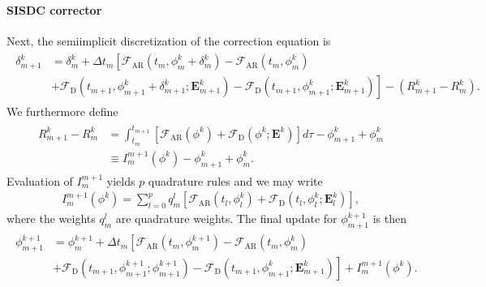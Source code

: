 \documentclass[letterpaper,10pt,english]{sphinxmanual}
\begin{document}
\paragraph{SISDC corrector}
\label{\detokenize{MinimalPlasmaModel:sisdc-corrector}}
Next, the semi\sphinxhyphen{}implicit discretization of the correction equation is
\begin{equation*}
\begin{split}\begin{split}
\delta_{m+1}^k &= \delta_m^k  + \Delta t_m\left[\mathcal{F}_{\textrm{AR}}\left(t_m, \phi_m^k + \delta_m^k\right) - \mathcal{F}_{\textrm{AR}}\left(t_m, \phi_m^k\right)\right.\\
&+ \left.\mathcal{F}_{\textrm{D}}\left(t_{m+1}, \phi_{m+1}^k + \delta_{m+1}^k; \mathbf{E}_{m+1}^k\right) - \mathcal{F}_{\textrm{D}}\left(t_{m+1}, \phi_{m+1}^k; \mathbf{E}_{m+1}^k\right)\right] - \left(R_{m+1}^k - R_{m}^k\right).
\end{split}\end{split}
\end{equation*}
We furthermore define
\begin{equation*}
\begin{split}\begin{split}
R_{m+1}^k - R_m^k &= \int_{t_m}^{t_{m+1}}\left[\mathcal{F}_{\textrm{AR}}\left(\phi^k\right) + \mathcal{F}_{\textrm{D}}\left(\phi^k; \mathbf{E}^k\right)\right]d\tau - \phi_{m+1}^k + \phi_m^k \\
&\equiv I_m^{m+1}\left(\phi^k\right) - \phi_{m+1}^k + \phi_m^k.
\end{split}\end{split}
\end{equation*}
Evaluation of \(I_m^{m+1}\) yields \(p\) quadrature rules and we may write
\begin{equation*}
\begin{split}I_m^{m+1}\left(\phi^k\right) = \sum_{l=0}^p q_m^l\left[\mathcal{F}_{\textrm{AR}}\left(t_l, \phi^k_l\right) + \mathcal{F}_{\textrm{D}}\left(t_l, \phi^k_l; \mathbf{E}_l^k\right)\right],\end{split}
\end{equation*}
where the weights \(q_m^l\) are quadrature weights. The final update for \(\phi^{k+1}_{m+1}\) is then
\begin{equation*}
\begin{split}\begin{split}
\phi_{m+1}^{k+1} &= \phi_{m}^{k+1} + \Delta t_m\left[\mathcal{F}_{\textrm{AR}}\left(t_m, \phi_m^{k+1}\right) -\mathcal{F}_{\textrm{AR}}\left(t_m, \phi_m^{k}\right)\right.\\
& + \left.\mathcal{F}_{\textrm{D}}\left(t_{m+1}, \phi_{m+1}^{k+1}; \phi_{m+1}^{k+1}\right) - \mathcal{F}_{\textrm{D}}\left(t_{m+1}, \phi_{m+1}^{k}; \mathbf{E}_{m+1}^k\right)\right] + I_{m}^{m+1}\left(\phi^k\right).
\end{split}\end{split}
\end{equation*}
\end{document}
